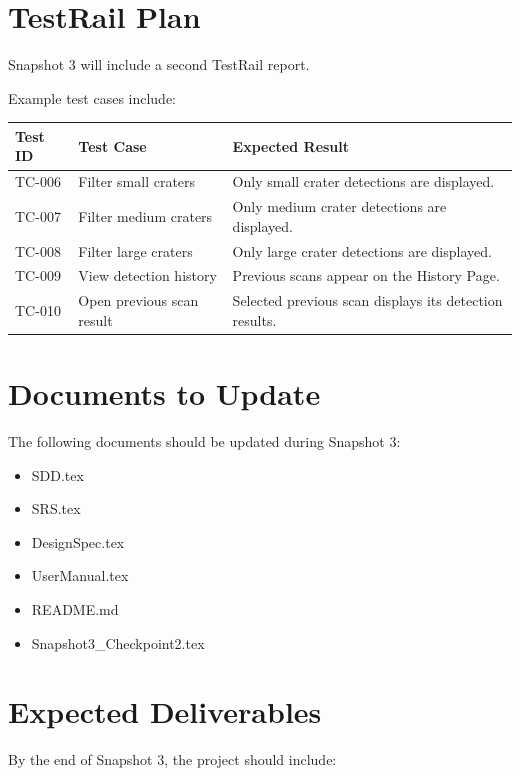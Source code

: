 \documentclass[12pt]{article}
\begin{document}
\section{TestRail Plan}

Snapshot 3 will include a second TestRail report.

Example test cases include:

\begin{longtable}{|p{1.2in}|p{2.4in}|p{2.4in}|}
\hline
\textbf{Test ID} & \textbf{Test Case} & \textbf{Expected Result} \\
\hline
TC-006 & Filter small craters & Only small crater detections are displayed. \\
\hline
TC-007 & Filter medium craters & Only medium crater detections are displayed. \\
\hline
TC-008 & Filter large craters & Only large crater detections are displayed. \\
\hline
TC-009 & View detection history & Previous scans appear on the History Page. \\
\hline
TC-010 & Open previous scan result & Selected previous scan displays its detection results. \\
\hline
\end{longtable}

\section{Documents to Update}

The following documents should be updated during Snapshot 3:

\begin{itemize}
    \item SDD.tex
    \item SRS.tex
    \item DesignSpec.tex
    \item UserManual.tex
    \item README.md
    \item Snapshot3\_Checkpoint2.tex
\end{itemize}

\section{Expected Deliverables}

By the end of Snapshot 3, the project should include:
\end{document}
